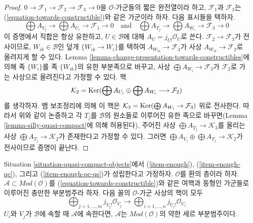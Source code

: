 \begin{proof}
$0 \to \mathcal{F}_1 \to \mathcal{F}_2 \to \mathcal{F}_3 \to 0$을
$\mathcal{O}$-가군들의 짧은 완전열이라 하고, $\mathcal{F}_1$과
$\mathcal{F}_3$는 (\ref{equation-towards-constructible})와 같은 가군이라
하자. 다음 표시들을 택하자.
$$
\bigoplus A_{V_j} \to \bigoplus A_{U_i} \to \mathcal{F}_1 \to 0
\quad\text{and}\quad
\bigoplus A_{T_j} \to \bigoplus A_{W_i} \to \mathcal{F}_3 \to 0
$$
이 증명에서 직합은 항상 유한하고, $U \in \mathcal{B}$에 대해
$A_U = j_{U!}\mathcal{O}_U$로 쓴다. $\mathcal{F}_2 \to \mathcal{F}_3$가
전사이므로, $W_{ik} \in \mathcal{B}$인 덮개 $\{W_{ik} \to W_i\}$를 택하여
$A_{W_{ik}} \to \mathcal{F}_3$가 사상
$A_{W_{ik}} \to \mathcal{F}_2$로 올려지게 할 수 있다. Lemma
\ref{lemma-change-presentation-towards-constructibles}에 의해 족 $\{W_i\}$를
족 $\{W_{ik}\}$의 유한 부분족으로 바꾸고, 사상
$\bigoplus A_{W_i} \to \mathcal{F}_3$가 $\mathcal{F}_2$로 가는 사상으로
올려진다고 가정할 수 있다. 핵
$$
\mathcal{K}_2 = \mathop{\mathrm{Ker}}(\bigoplus A_{U_i} \oplus \bigoplus A_{W_i}
\longrightarrow \mathcal{F}_2)
$$
를 생각하자. 뱀 보조정리에 의해 이 핵은
$\mathcal{K}_3 = \mathop{\mathrm{Ker}}(\bigoplus A_{W_i} \to \mathcal{F}_3)$ 위로 전사한다.
따라서 위와 같이 논증하고 각 $T_j$를 $\mathcal{B}$의 원소들로 이루어진
유한 족으로 바꾸면(Lemma \ref{lemma-silly-quasi-compact}에 의해 허용된다),
주어진 사상 $\bigoplus A_{T_j} \to \mathcal{K}_3$를 올리는 사상
$\bigoplus A_{T_j} \to \mathcal{K}_2$가 존재한다고 가정할 수 있다. 그러면
$\bigoplus A_{V_j} \oplus \bigoplus A_{T_j} \to \mathcal{K}_2$가
전사이므로 증명이 끝난다.
\end{proof}

\begin{lemma}
\label{lemma-towards-constructible-when-serre-subcategory}
Situation \ref{situation-quasi-compact-objects}에서
(\ref{item-enough}), (\ref{item-enough-qc}), 그리고
(\ref{item-enough-qc-qs})가 성립한다고 가정하자. $\mathcal{O}$를 환의 층이라
하자. $\mathcal{A} \subset \textit{Mod}(\mathcal{O})$를
(\ref{equation-towards-constructible})와 같은 여핵과 동형인 가군들로 이루어진
충만한 부분범주라 하자. 다음 꼴의 $\mathcal{O}$-가군 사상의 핵이 모두
$$
\bigoplus\nolimits_{j = 1, \ldots, m} j_{V_j!}\mathcal{O}_{V_j}
\longrightarrow
\bigoplus\nolimits_{i = 1, \ldots, n} j_{U_i!}\mathcal{O}_{U_i}
$$
$U_i$와 $V_j$가 $\mathcal{B}$에 속할 때 $\mathcal{A}$에 속한다면,
$\mathcal{A}$는 $\textit{Mod}(\mathcal{O})$의 약한 세르 부분범주이다.
\end{lemma}

